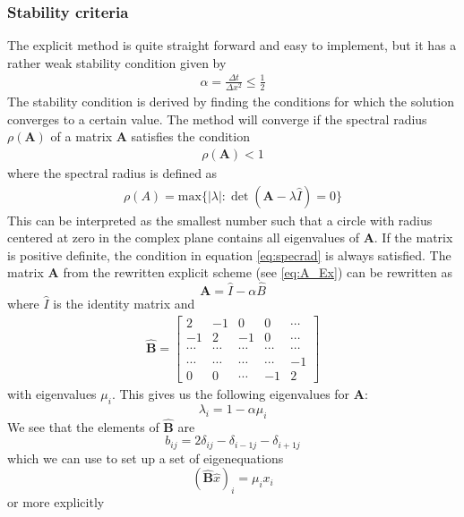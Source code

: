 \documentclass[%
 reprint,
nofootinbib,
aps,
]{revtex4-1}
\renewcommand{\vec}[1]{\mathbf{#1}} %
\begin{document}
\subsubsection{Stability criteria} \label{sec:exstab}
The explicit method is quite straight forward and easy to implement, but it has a rather weak stability condition given by
\begin{align*}
    \alpha = \frac{\Delta t}{\Delta x^2} \le \frac{1}{2}
\end{align*}
The stability condition is derived by finding the conditions for which the solution converges to a certain value.
The method will converge if the spectral radius $\rho(\textbf{A})$ of a matrix $\textbf{A}$ satisfies the condition
\begin{align} \label{eq:specrad}
    \rho(\textbf{A}) < 1
\end{align}
where the spectral radius is defined as
\begin{align*}
  \rho(A) = \text{max}\{|\lambda|:\det (\textbf{A}-\lambda \hat I) = 0\}
\end{align*}
This can be interpreted as the smallest number such that a circle with radius centered at zero in the complex plane contains all eigenvalues of $\textbf{A}$. If the matrix is positive definite, the condition in equation \ref{eq:specrad} is always satisfied. The matrix $\textbf{A}$ from the rewritten explicit scheme (see \ref{eq:A_Ex}) can be rewritten as $$\textbf{A} = \hat I - \alpha \hat B$$ where $\hat{I}$ is the identity matrix and
\begin{align*}
    \hat{\vec{B}} = \begin{bmatrix}
                    2 & -1 & 0 & 0 & \cdots \\
                    -1 & 2 & -1 & 0 & \cdots \\
                    \cdots & \cdots & \cdots & \cdots & \cdots \\
                    \cdots & \cdots & \cdots & \cdots & -1 \\
                    0 & 0 & \cdots & -1 & 2
    \end{bmatrix}
\end{align*}
with eigenvalues $\mu_i$. This gives us the following eigenvalues for \textbf{A}: $$\lambda_i = 1-\alpha \mu_i$$
We see that the elements of $\hat{\vec{B}}$ are $$b_{ij} = 2 \delta_{ij} - \delta_{i-1j} - \delta_{i+1j}$$ which we can use to set up a set of eigenequations $$(\hat{\vec{B}} \hat x)_i = \mu_i x_i$$ or more explicitly
\end{document}
